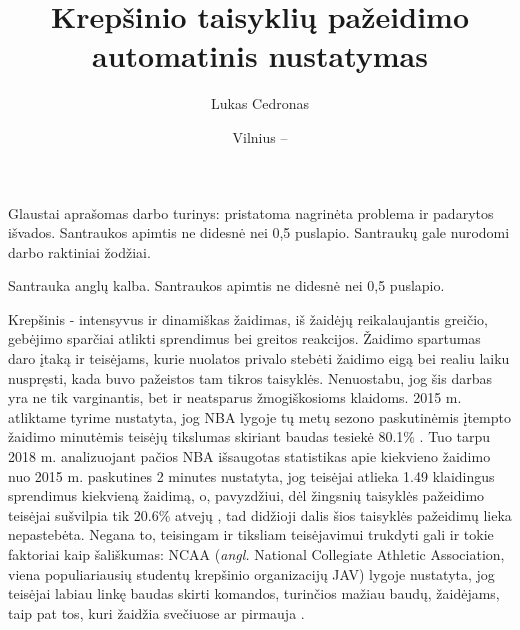 \documentclass{VUMIFPSbakalaurinis}
\institute{Informatikos institutas}  %
\title{Krepšinio taisyklių pažeidimo automatinis nustatymas}
\author{Lukas Cedronas}
\date{Vilnius – \the\year}
\begin{document}
\maketitle


Glaustai aprašomas darbo turinys: pristatoma nagrinėta problema ir padarytos
išvados. Santraukos apimtis ne didesnė nei 0,5 puslapio. Santraukų gale
nurodomi darbo raktiniai žodžiai. 

Santrauka anglų kalba. Santraukos apimtis ne didesnė nei 0,5 puslapio.

\tableofcontents



Krepšinis - intensyvus ir dinamiškas žaidimas, iš žaidėjų reikalaujantis greičio, gebėjimo sparčiai atlikti sprendimus bei greitos reakcijos. Žaidimo spartumas daro įtaką ir teisėjams, kurie nuolatos privalo stebėti žaidimo eigą bei realiu laiku nuspręsti, kada buvo pažeistos tam tikros taisyklės. Nenuostabu, jog šis darbas yra ne tik varginantis, bet ir neatsparus žmogiškosioms klaidoms. 2015 m. atliktame tyrime nustatyta, jog NBA lygoje tų metų sezono paskutinėmis įtempto žaidimo minutėmis teisėjų tikslumas skiriant baudas tesiekė 80.1\% \cite{NBA_bias_Referee}. Tuo tarpu 2018 m. analizuojant pačios NBA išsaugotas statistikas apie kiekvieno žaidimo nuo 2015 m. paskutines 2 minutes nustatyta, jog teisėjai atlieka 1.49 klaidingus sprendimus kiekvieną žaidimą, o, pavyzdžiui, dėl žingsnių taisyklės pažeidimo teisėjai sušvilpia tik 20.6\% atvejų \cite{SiglerK}, tad didžioji dalis šios taisyklės pažeidimų lieka nepastebėta. Negana to, teisingam ir tiksliam teisėjavimui trukdyti gali ir tokie faktoriai kaip šališkumas: NCAA (\textit{angl.} National Collegiate Athletic Association, viena populiariausių studentų krepšinio organizacijų JAV) lygoje nustatyta, jog teisėjai labiau linkę baudas skirti komandos, turinčios mažiau baudų, žaidėjams, taip pat tos, kuri žaidžia svečiuose ar pirmauja \cite{OfficiatingBias}. 
\end{document}
